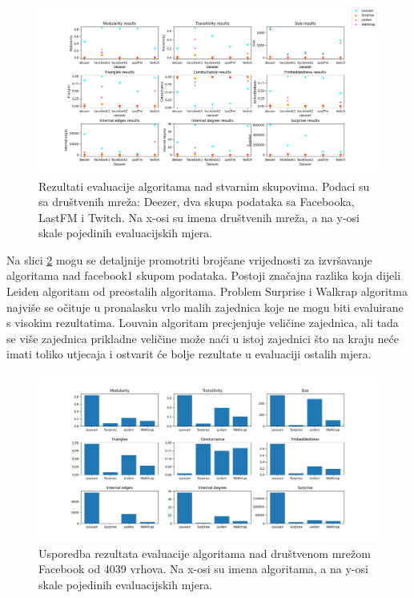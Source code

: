 \documentclass[times, utf8, diplomski]{fer}
\begin{document}
\begin{figure}
	\includegraphics[width=\linewidth]{images/test3.png}
	\caption{Rezultati evaluacije algoritama nad stvarnim skupovima. Podaci su sa društvenih mreža: Deezer, dva skupa podataka sa Facebooka, LastFM i Twitch. Na x-osi su imena društvenih mreža, a na y-osi skale pojedinih evaluacijskih mjera.}
	\label{fig:test3}
\end{figure}


Na slici \ref{fig:facebook_res} mogu se detaljnije promotriti brojčane vrijednosti za izvršavanje algoritama nad facebook1 skupom podataka. Postoji značajna razlika koja dijeli Leiden algoritam od preostalih algoritama. Problem Surprise i Walkrap algoritma najviše se očituje u pronalasku vrlo malih zajednica koje ne mogu biti evaluirane s visokim rezultatima. Louvain algoritam precjenjuje veličine zajednica, ali tada se više zajednica prikladne veličine može naći u istoj zajednici što na kraju neće imati toliko utjecaja i ostvarit će bolje rezultate u evaluaciji ostalih mjera.



\begin{figure}
	\includegraphics[width=\linewidth]{images/facebook1.png}
	\caption{Usporedba rezultata evaluacije algoritama nad društvenom mrežom Facebook od 4039 vrhova. Na x-osi su imena algoritama, a na y-osi skale pojedinih evaluacijskih mjera.}
	\label{fig:facebook_res}
\end{figure}
\end{document}

